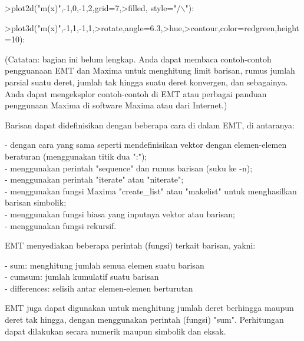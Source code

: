 \documentclass{article}
\begin{document}
\begin{eulernotebook}
\begin{eulercomment}
\begin{eulercomment}
\begin{eulerprompt}
>plot2d("m(x)",-1,0,-1,2,grid=7,>filled, style="/\(\backslash\)"): 
\end{eulerprompt}
\begin{eulerprompt}
>plot3d("m(x)",-1,1,-1,1,>rotate,angle=6.3,>hue,>contour,color=redgreen,height=10):
\end{eulerprompt}
\begin{eulercomment}
(Catatan: bagian ini belum lengkap. Anda dapat membaca contoh-contoh pengguanaan EMT dan
Maxima untuk menghitung limit barisan, rumus jumlah parsial suatu deret, jumlah tak hingga
suatu deret konvergen, dan sebagainya. Anda dapat mengeksplor contoh-contoh di EMT atau
perbagai panduan penggunaan Maxima di software Maxima atau dari Internet.)

Barisan dapat didefinisikan dengan beberapa cara di dalam EMT, di antaranya:

- dengan cara yang sama seperti mendefinisikan vektor dengan elemen-elemen beraturan
(menggunakan titik dua ":");\\
- menggunakan perintah "sequence" dan rumus barisan (suku ke -n);\\
- menggunakan perintah "iterate" atau "niterate";\\
- menggunakan fungsi Maxima "create\_list" atau "makelist" untuk menghasilkan barisan
simbolik;\\
- menggunakan fungsi biasa yang inputnya vektor atau barisan;\\
- menggunakan fungsi rekursif.

EMT menyediakan beberapa perintah (fungsi) terkait barisan, yakni:

- sum: menghitung jumlah semua elemen suatu barisan\\
- cumsum: jumlah kumulatif suatu barisan\\
- differences: selisih antar elemen-elemen berturutan

EMT juga dapat digunakan untuk menghitung jumlah deret berhingga maupun deret tak hingga,
dengan menggunakan perintah (fungsi) "sum". Perhitungan dapat dilakukan secara numerik
maupun simbolik dan eksak.


\end{eulercomment}
\end{eulercomment}
\end{eulercomment}
\end{eulernotebook}
\end{document}
